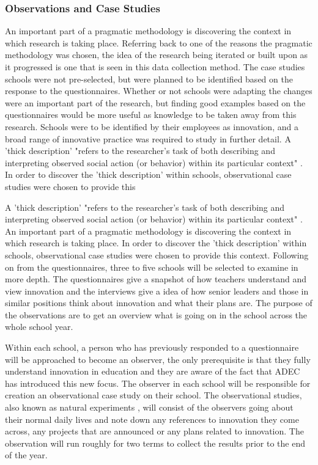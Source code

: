 \subsubsection{Observations and Case Studies}  An important part of a pragmatic methodology is discovering the context in which research is taking place. Referring back to one of the reasons the pragmatic methodology was chosen, the idea of the research being iterated or built upon as it progressed is one that is seen in this data collection method. The case studies schools were not pre-selected, but were planned to be identified based on the response to the questionnaires. Whether or not schools were adapting the changes were an important part of the research, but finding good examples based on the questionnaires would be more useful as knowledge to be taken away from this research. Schools were to be identified by their employees as innovation, and a broad range of innovative practice was required to study in further detail. A 'thick description' "refers to the researcher’s task of both describing and interpreting observed social action (or behavior) within its particular context" \cite[p. 543]{thickdescription}. In order to discover the 'thick description' within schools, observational case studies were chosen to provide this

A 'thick description' "refers to the researcher’s task of both describing and interpreting observed social action (or behavior) within its particular context" \cite[p. 543]{thickdescription}. An important part of a pragmatic methodology is discovering the context in which research is taking place. In order to discover the 'thick description' within schools, observational case studies were chosen to provide this context.
Following on from the questionnaires, three to five schools will be selected to examine in more depth. The questionnaires give a snapshot of how teachers understand and view innovation and the interviews give a idea of how senior leaders and those in similar positions think about innovation and what their plans are. The purpose of the observations are to get an overview what is going on in the school across the whole school year. 

Within each school, a person who has previously responded to a questionnaire will be approached to become an observer, the only prerequisite is that they fully understand innovation in education and they are aware of the fact that ADEC has introduced this new focus. The observer in each school will be responsible for creation an observational case study on their school. The observational studies, also known as natural experiments \cite[p. 2]{0a338f}, will consist of the observers going about their normal daily lives and note down any references to innovation they come across, any projects that are announced or any plans related to innovation. The observation will run roughly for two terms to collect the results prior to the end of the year.

